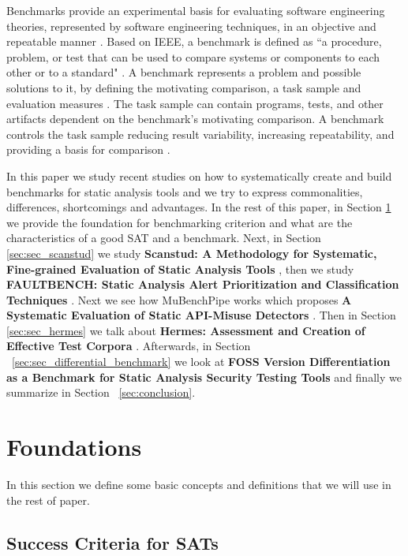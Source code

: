 \documentclass[authoryear,preprint]{sigplanconf}
\begin{document}
Benchmarks provide an experimental basis for evaluating software engineering theories, represented by software engineering techniques, in an objective and repeatable manner \cite{675631}. Based on IEEE, a benchmark is defined as ``a procedure, problem, or test that can be used to compare systems or components to each other or to a standard" \cite{IEEE1990}. A benchmark represents a problem and possible solutions to it, by defining the motivating comparison, a task sample and evaluation measures \cite{sim2003}.  The task sample can contain programs, tests, and other artifacts dependent on the benchmark’s motivating comparison. A benchmark controls the task sample reducing result variability, increasing repeatability, and providing a basis for comparison \cite{sim2003}.

In this paper we study recent studies on how to systematically create and build benchmarks for static analysis tools and we try to express commonalities, differences, shortcomings and advantages. In the rest of this paper, in Section \ref{sec:sec_approaches} we provide the foundation for benchmarking criterion and what are the characteristics of a good SAT and a benchmark. Next, in Section \ref{sec:sec_scanstud} we study \textbf{Scanstud: A Methodology for Systematic, Fine-grained Evaluation of Static Analysis Tools} \cite{Scanstud}, then we study \textbf{FAULTBENCH: Static
	Analysis Alert Prioritization and Classification Techniques} \cite{Heckman:2008:EBE:1414004.1414013}. Next we see how MuBenchPipe works which proposes \textbf{A Systematic Evaluation of Static API-Misuse Detectors} \cite{8338426}. Then in Section \ref{sec:sec_hermes} we talk about \textbf{Hermes: Assessment and Creation of Effective Test Corpora} \cite{Reif:2017:HAC:3088515.3088523}. Afterwards, in Section ~\ref{sec:sec_differential_benchmark} we look at \textbf{FOSS Version Differentiation as a Benchmark for Static Analysis Security Testing Tools} \cite{Pashchenko:2017:FVD:3106237.3121276} and finally we summarize in Section ~\ref{sec:conclusion}. 

\section{Foundations}
\label{sec:sec_approaches}

In this section we define some basic concepts and definitions that we will use in the rest of paper. 

\subsection{Success Criteria for SATs}
\label{sec:subsec_successc}
\end{document}
